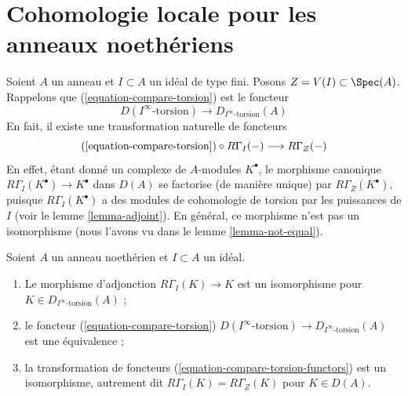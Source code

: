 \section{Cohomologie locale pour les anneaux noethériens}
\label{section-local-cohomology-noetherian}

\noindent
Soient $A$ un anneau et $I \subset A$ un idéal de type fini.
Posons $Z = V(I) \subset \Spec(A)$. Rappelons que (\ref{equation-compare-torsion}) est le foncteur
$$
D(I^\infty\text{-torsion}) \to D_{I^\infty\text{-torsion}}(A)
$$
En fait, il existe une transformation naturelle de foncteurs
\begin{equation}
\label{equation-compare-torsion-functors}
(\ref{equation-compare-torsion}) \circ R\Gamma_I(-)
\longrightarrow
R\Gamma_Z(-)
\end{equation}
En effet, étant donné un complexe de $A$-modules $K^\bullet$,
le morphisme canonique $R\Gamma_I(K^\bullet) \to K^\bullet$ dans $D(A)$ se factorise
(de manière unique) par $R\Gamma_Z(K^\bullet)$, puisque $R\Gamma_I(K^\bullet)$ a des modules
de cohomologie de torsion par les puissances de $I$
(voir le lemme \ref{lemma-adjoint}).
En général, ce morphisme n'est pas un isomorphisme
(nous l'avons vu dans le lemme \ref{lemma-not-equal}).

\begin{lemma}
\label{lemma-local-cohomology-noetherian}
Soient $A$ un anneau noethérien et $I \subset A$ un idéal.
\begin{enumerate}
\item Le morphisme d'adjonction $R\Gamma_I(K) \to K$ est un isomorphisme
pour $K \in D_{I^\infty\text{-torsion}}(A)$ ;
\item le foncteur
(\ref{equation-compare-torsion})
$D(I^\infty\text{-torsion}) \to D_{I^\infty\text{-torsion}}(A)$
est une équivalence ;
\item la transformation de foncteurs
(\ref{equation-compare-torsion-functors}) est un isomorphisme,
autrement dit $R\Gamma_I(K) = R\Gamma_Z(K)$ pour $K \in D(A)$.
\end{enumerate}
\end{lemma}

